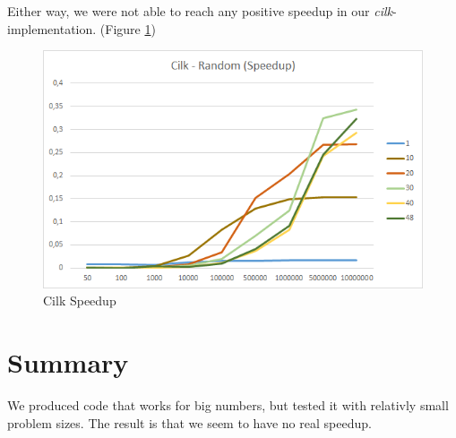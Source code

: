 \documentclass[12pt,a4paper,titlepage,oneside]{scrartcl}
\begin{document}
Either way, we were not able to reach any positive speedup in our \textit{cilk}-implementation. (Figure \ref{fig:saturn_cilk_speedup_random})

\begin{figure}[h]
\includegraphics[width=\linewidth]{Saturn_Cilk_Speedup_Random}
\caption{Cilk Speedup}
\label{fig:saturn_cilk_speedup_random}
\end{figure}

\section{Summary}
We produced code that works for big numbers, but tested it with relativly small problem sizes. The result is that we seem to have no real speedup.



%
%
\end{document}
